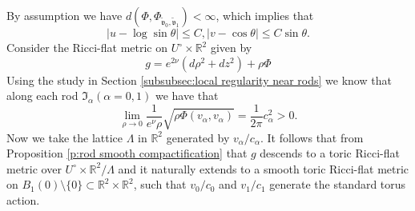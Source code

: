 \documentclass[a4paper,11pt]{amsart}
\theoremstyle{definition}
\numberwithin{equation}{section}
\newcommand{\R}{\mathbb{R}}
\newcommand{\mv} {\mathfrak v}
\begin{document}
 By assumption we have $d(\Phi, \Phi_{\tilde{\mv}_0, \tilde{\mv}_1})<\infty$,  which implies that 
 \begin{equation}
	|u-\log\sin\theta|\leq C, |v-\cos\theta|\leq C\sin\theta.
\end{equation} 
Consider the Ricci-flat metric on $U^\circ\times \R^2$ given by $$g=e^{2\nu}(d\rho^2+dz^2)+\rho\Phi$$
Using the study in Section \ref{subsubsec:local regularity near rods} we know that along each rod $\mathfrak {I}_\alpha (\alpha=0, 1)$ we have that 
$$\lim_{\rho\to0}\frac{1}{e^\nu\rho}\sqrt{{\rho\Phi(v_\alpha,v_\alpha)}}=\frac{1}{2\pi}c^2_\alpha>0.$$
Now we take the lattice $\Lambda$ in $\mathbb R^2$ generated by $v_\alpha/c_\alpha$. It follows that from Proposition \ref{p:rod smooth compactification} that $g$ descends to a toric Ricci-flat metric over $U^\circ\times \R^2/\Lambda$ and it  naturally extends to a smooth toric Ricci-flat metric on $ B_1(0)\setminus\{0\}\subset \mathbb R^2\times \mathbb R^2$, such that $v_0/c_0$ and $v_1/c_1$ generate the standard torus action. 
\end{document}
